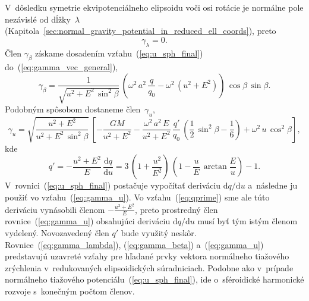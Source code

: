 \documentclass[a4paper,12pt]{book}
\newcommand{\diff}{\mathrm d}
\begin{document}
V~dôsledku symetrie ekvipotenciálneho elipsoidu voči osi rotácie je normálne 
pole nezávislé od dĺžky~$\lambda$ 
(Kapitola~\ref{sec:normal_gravity_potential_in_reduced_ell_coords}), preto
%
\begin{equation}
\label{eq:gamma_lambda}
\gamma_\lambda = 0{.}
\end{equation}
%
Člen $\gamma_\beta$ získame dosadením vzťahu~(\ref{eq:u_sph_final}) 
do~(\ref{eq:gamma_vec_general}),
%
\begin{equation}
\label{eq:gamma_beta}
\gamma_\beta = \frac{1}{\sqrt{u^2 + E^2 \, \sin^2\beta}} \, \left( \omega^2 \, 
a^2 \, \frac{q}{q_0} - \omega^2 \, (u^2 + E^2) \right) \, \cos\beta \, 
\sin\beta{.}
\end{equation}
%
Podobným spôsobom dostaneme člen~$\gamma_u$,
%
\begin{equation}
\label{eq:gamma_u}
\gamma_u = \sqrt{\dfrac{u^2 + E^2}{u^2 + E^2 \, \sin^2\beta}} \, \left[ 
-\frac{GM}{u^2 + E^2} - \frac{\omega^2 \, a^2 \, E}{u^2 + E^2} \, 
\frac{q'}{q_0} \, \left( \frac{1}{2} \, \sin^2\beta - \frac{1}{6} \right) 
+ \omega^2 \, u \, \cos^2\beta \right]{,}
\end{equation}
%
kde \parencite{MoritzPhysicalGeodesy}
%
\begin{equation}
\label{eq:qprime}
q' = -\frac{u^2 + E^2}{E} \, \frac{\diff q}{\diff u} = 3 \, \left( 
1 + \frac{u^2}{E^2} \right) \, \left(  1 - \frac{u}{E} \, \arctan\frac{E}{u} 
\right) - 1{.}
\end{equation}
%
V~rovnici~(\ref{eq:u_sph_final}) postačuje vypočítať deriváciu $\diff q \slash 
\diff u$ a~následne ju použiť vo vzťahu~(\ref{eq:gamma_u}).  Vo 
vzťahu~(\ref{eq:qprime}) sme ale túto deriváciu vynásobili členom $-\frac{u^2 
+ E^2}{E}$, preto prostredný člen rovnice~(\ref{eq:gamma_u}) obsahujúci 
deriváciu $\diff q \slash \diff u$ musí byť tým istým členom vydelený.  
Novozavedený člen $q'$ bude využitý neskôr.  Rovnice~(\ref{eq:gamma_lambda}), 
(\ref{eq:gamma_beta}) a~(\ref{eq:gamma_u}) predstavujú uzavreté vzťahy pre 
hľadané prvky vektora normálneho tiažového zrýchlenia v~redukovaných 
elipsoidických súradniciach.  Podobne ako v~prípade normálneho tiažového 
potenciálu~(\ref{eq:u_sph_final}), ide o~sféroidické harmonické rozvoje 
s~konečným počtom členov.
\end{document}
